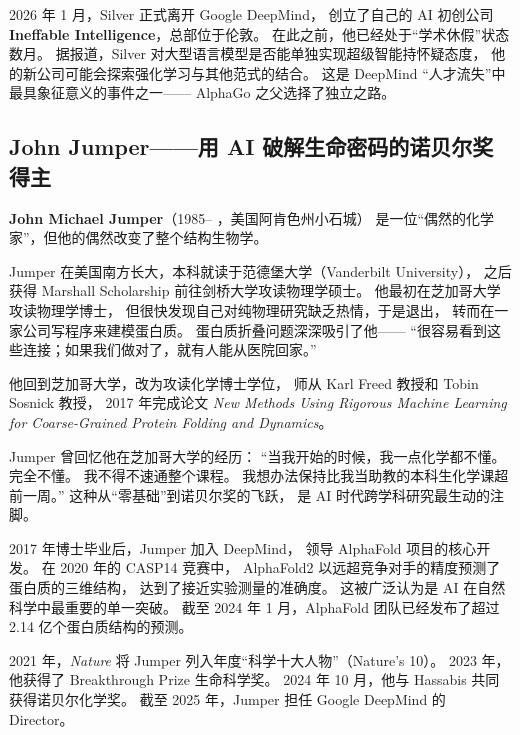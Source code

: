 \begin{whybox}
2026 年 1 月，Silver 正式离开 Google DeepMind，
创立了自己的 AI 初创公司 \textbf{Ineffable Intelligence}，总部位于伦敦。
在此之前，他已经处于``学术休假''状态数月。
据报道，Silver 对大型语言模型是否能单独实现超级智能持怀疑态度，
他的新公司可能会探索强化学习与其他范式的结合。
这是 DeepMind ``人才流失''中最具象征意义的事件之一——
AlphaGo 之父选择了独立之路。
\end{whybox}


\subsection{John Jumper——用 AI 破解生命密码的诺贝尔奖得主}
\label{subsec:jumper}

\noindent\textbf{John Michael Jumper}（1985-- ，美国阿肯色州小石城）
是一位``偶然的化学家''，但他的偶然改变了整个结构生物学。

Jumper 在美国南方长大，本科就读于范德堡大学（Vanderbilt University），
之后获得 Marshall Scholarship 前往剑桥大学攻读物理学硕士。
他最初在芝加哥大学攻读物理学博士，
但很快发现自己对纯物理研究缺乏热情，于是退出，
转而在一家公司写程序来建模蛋白质。
蛋白质折叠问题深深吸引了他——
``很容易看到这些连接；如果我们做对了，就有人能从医院回家。''

他回到芝加哥大学，改为攻读化学博士学位，
师从 Karl Freed 教授和 Tobin Sosnick 教授，
2017 年完成论文 \textit{New Methods Using Rigorous Machine Learning
for Coarse-Grained Protein Folding and Dynamics}。

\begin{corebox}[``我到的时候一点化学都不懂'']
Jumper 曾回忆他在芝加哥大学的经历：
``当我开始的时候，我一点化学都不懂。完全不懂。
我不得不速通整个课程。
我想办法保持比我当助教的本科生化学课超前一周。''
这种从``零基础''到诺贝尔奖的飞跃，
是 AI 时代跨学科研究最生动的注脚。
\end{corebox}

2017 年博士毕业后，Jumper 加入 DeepMind，
领导 AlphaFold 项目的核心开发。
在 2020 年的 CASP14 竞赛中，
AlphaFold2 以远超竞争对手的精度预测了蛋白质的三维结构，
达到了接近实验测量的准确度。
这被广泛认为是 AI 在自然科学中最重要的单一突破。
截至 2024 年 1 月，AlphaFold 团队已经发布了超过 2.14 亿个蛋白质结构的预测。

2021 年，\textit{Nature} 将 Jumper 列入年度``科学十大人物''（Nature's 10）。
2023 年，他获得了 Breakthrough Prize 生命科学奖。
2024 年 10 月，他与 Hassabis 共同获得诺贝尔化学奖。
截至 2025 年，Jumper 担任 Google DeepMind 的 Director。


